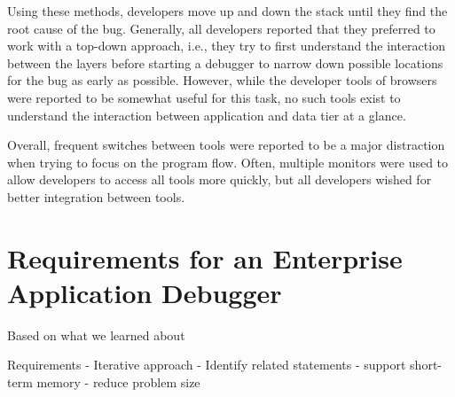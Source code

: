 Using these methods, developers move up and down the stack until they find the root cause of the bug.
Generally, all developers reported that they preferred to work with a top-down approach, i.e., they try to first understand the interaction between the layers before starting a debugger to narrow down possible locations for the bug as early as possible.
However, while the developer tools of browsers were reported to be somewhat useful for this task, no such tools exist to understand the interaction between application and data tier at a glance.

Overall, frequent switches between tools were reported to be a major distraction when trying to focus on the program flow.
Often, multiple monitors were used to allow developers to access all tools more quickly, but all developers wished for better integration between tools.
\tmpEnd

\section{Requirements for an Enterprise Application Debugger}

Based on what we learned about


Requirements
- Iterative approach
- Identify related statements
- support short-term memory
- reduce problem size



